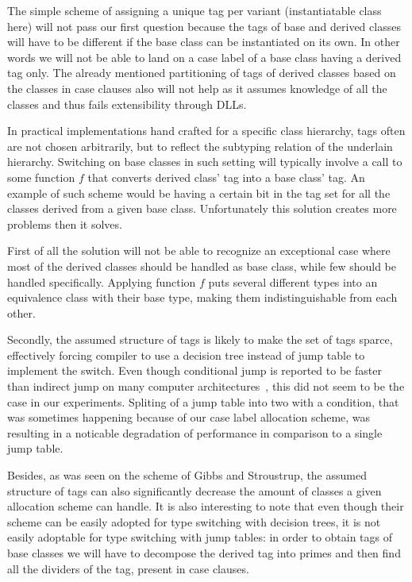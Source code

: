 \documentclass[preprint]{sigplanconf}
\begin{document}
The simple scheme of assigning a unique tag per variant (instantiatable class 
here) will not pass our first question because the tags of base and derived 
classes will have to be different if the base class can be instantiated on its 
own. In other words we will not be able to land on a case label of a base class 
having a derived tag only. The already mentioned partitioning of tags of derived 
classes based on the classes in case clauses also will not help as it assumes 
knowledge of all the classes and thus fails extensibility through DLLs.

In practical implementations hand crafted for a specific class hierarchy, tags 
often are not chosen arbitrarily, but to reflect the subtyping relation of the 
underlain hierarchy. Switching on base classes in such setting will typically 
involve a call to some function $f$ that converts derived class' tag into a base 
class' tag. An example of such scheme would be having a certain bit in the tag 
set for all the classes derived from a given base class. Unfortunately this 
solution creates more problems then it solves.

First of all the solution will not be able to recognize an exceptional case 
where most of the derived classes should be handled as base class, while few 
should be handled specifically. Applying function $f$ puts several different 
types into an equivalence class with their base type, making them 
indistinguishable from each other.

Secondly, the assumed structure of tags is likely to make the set of tags 
sparce, effectively forcing compiler to use a decision tree instead of jump 
table to implement the switch. Even though conditional jump is reported to be 
faster than indirect jump on many computer architectures~\cite[]{garrigue-98}, this did not seem to be the case in our experiments. Spliting 
of a jump table into two with a condition, that was sometimes happening because 
of our case label allocation scheme, was resulting in a noticable degradation of 
performance in comparison to a single jump table.

Besides, as was seen on the scheme of Gibbs and Stroustrup, the assumed 
structure of tags can also significantly decrease the amount of classes a given 
allocation scheme can handle. It is also interesting to note that even though 
their scheme can be easily adopted for type switching with decision trees, it is 
not easily adoptable for type switching with jump tables: in order to obtain 
tags of base classes we will have to decompose the derived tag into primes and 
then find all the dividers of the tag, present in case clauses.
\end{document}
